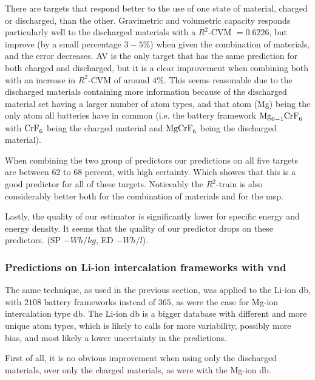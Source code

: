 	There are targets that respond better to the use of one state of material, charged or discharged, than the other. Gravimetric and volumetric capacity responds particularly well to the discharged materials with a $R^2$-CVM $= 0.6226$, but improve (by a small percentage $3-5\%$) when given the combination of materials, and the error decreases. AV is the only target that has the same prediction for both charged and discharged, but it is a clear improvement when combining both with an increase in $R^2$-CVM of around $4\%$. This seems reasonable due to the discharged materials containing more information because of the discharged material set having a larger number of atom types, and that atom (Mg) being the only atom all batteries have in common (i.e. the battery framework $\ce{Mg_{0-1}CrF_6}$ with $\ce{CrF_6}$ being the charged material and  $\ce{MgCrF_6}$ being the discharged material).


When combining the two group of predictors our predictions on all five targets are between $62$ to $68$ percent, with high certainty. Which showes that this is a good predictor for all of these targets. Noticeably the $R^2$-train is also considerably better both for the combination of materials and for the msp.  


Lastly, the quality of our estimator is significantly lower for specific energy and energy density. It seems that the quality of our predictor drops on these predictors. (SP $- \si{Wh/kg}$, ED $- \si{Wh/l}$). 

\FloatBarrier
\subsubsection*{Predictions on Li-ion intercalation frameworks with vnd}
The same technique, as used in the previous section, was applied to the Li-ion db, with $2108$ battery frameworks instead of $365$, as were the case for Mg-ion intercalation type db. The Li-ion db is a bigger database with different and more unique atom types, which is likely to calls for more variability, possibly more bias, and most likely a lower uncertainty in the predictions.

First of all, it is no obvious improvement when using only the discharged materials, over only the charged materials, as were with the Mg-ion db. 

